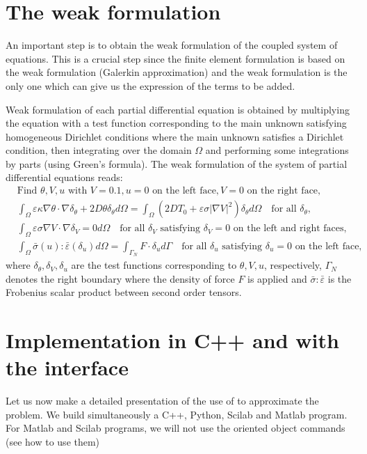 \documentclass[a4paper,11pt,english]{sphinxmanual}
\begin{document}
\section{The weak formulation}
\label{\detokenize{tutorial/thermo_coupling:the-weak-formulation}}
\sphinxAtStartPar
An important step is to obtain the weak formulation of the coupled system of equations. This is a crucial step since the finite element formulation is based on the weak formulation (Galerkin approximation) and the weak formulation is the only one which can give us the expression of the terms to be added.

\sphinxAtStartPar
Weak formulation of each partial differential equation is obtained by multiplying the equation with a test function corresponding to the main unknown satisfying homogeneous Dirichlet conditions where the main unknown satisfies a Dirichlet condition, then integrating over the domain \(\Omega\) and performing some integrations by parts (using Green’s formula). The weak formulation of the system of partial differential equations reads:
\begin{equation*}
\begin{split}&\mbox{Find } \theta, V, u \mbox{ with } V = 0.1, u = 0 \mbox{ on the left face}, V = 0 \mbox{ on the right face}, \\
& \int_{\Omega} \varepsilon\kappa\nabla\theta\cdot\nabla\delta_{\theta} + 2D\theta\delta_{\theta}d\Omega = \int_{\Omega} (2DT_0 + \varepsilon\sigma|\nabla V|^2)\delta_{\theta} d\Omega ~~~\mbox{ for all } \delta_{\theta}, \\
& \int_{\Omega} \varepsilon\sigma\nabla V\cdot\nabla\delta_V = 0 d\Omega ~~~ \mbox{ for all } \delta_V \mbox{ satisfying } \delta_V = 0 \mbox{ on the left and right faces}, \\
& \int_{\Omega} \bar{\sigma}(u):\bar{\varepsilon}(\delta_u)d\Omega = \int_{\Gamma_N} F\cdot \delta_u d\Gamma ~~~ \mbox{ for all } \delta_{u} \mbox{ satisfying } \delta_u = 0 \mbox{ on the left face},\end{split}
\end{equation*}
\sphinxAtStartPar
where \(\delta_{\theta}, \delta_V, \delta_u\) are the test functions corresponding to \(\theta, V, u\), respectively, \(\Gamma_N\) denotes the right boundary where the density of force \(F\) is applied and \(\bar{\sigma}:\bar{\varepsilon}\) is the Frobenius scalar product between second order tensors.


\section{Implementation in C++ and with the interface}
\label{\detokenize{tutorial/thermo_coupling:implementation-in-c-and-with-the-interface}}
\sphinxAtStartPar
Let us now make a detailed presentation of the use of  to approximate the problem. We build simultaneously a C++, Python, Scilab and Matlab program. For Matlab and Scilab programs, we will not use the oriented object commands (see  how to use them)
\end{document}
